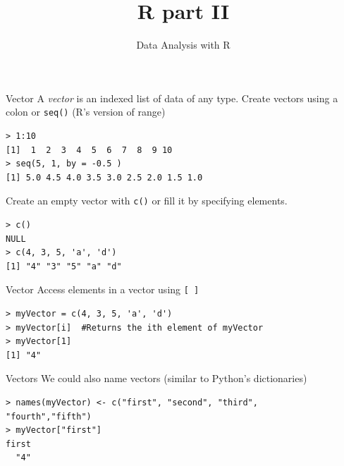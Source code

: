 \documentclass[xcolor=svgnames, 10pt, handout]{beamer}
\title
  [R]
  {R part II}
\subtitle{Data Analysis with R}
\begin{document}
\maketitle


\begin{frame}[fragile]{Vector}
A \emph{vector} is an indexed list of data of any type.
\vfill
Create vectors using a colon or \texttt{seq()} (R's version of range)
\begin{Verbatim}[commandchars=\\\{\}, xleftmargin=2em]
> 1:10
[1]  1  2  3  4  5  6  7  8  9 10
> seq(5, 1, by = -0.5 )
[1] 5.0 4.5 4.0 3.5 3.0 2.5 2.0 1.5 1.0
\end{Verbatim}
\vfill
Create an empty vector with \texttt{c()} or fill it by specifying elements.
\begin{Verbatim}[commandchars=\\\{\}, xleftmargin=2em]
> c()
NULL
> c(4, 3, 5, 'a', 'd')
[1] "4" "3" "5" "a" "d"
\end{Verbatim}
\end{frame}


\begin{frame}[fragile]{Vector}
Access elements in a vector using \texttt{[ ]}
\begin{Verbatim}[commandchars=\\\{\}, xleftmargin=2em]
> myVector = c(4, 3, 5, 'a', 'd')
> myVector[i]  #Returns the ith element of myVector
> myVector[1]
[1] "4"
\end{Verbatim}
\end{frame}


\begin{frame}[fragile]{ Vectors}
We could also name vectors (similar to Python's dictionaries)
\begin{Verbatim}[commandchars=\\\{\}, xleftmargin=2em]
> names(myVector) <- c("first", "second", "third",
"fourth","fifth")
> myVector["first"]
first 
  "4" 
\end{Verbatim}
\end{frame}


\end{document}
